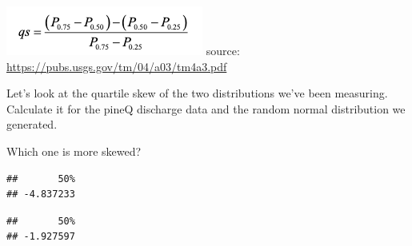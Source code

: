 \documentclass[
]{book}
\newenvironment{Shaded}{\begin{snugshade}}{\end{snugshade}}
\newcommand{\DecValTok}[1]{\textcolor[rgb]{0.00,0.00,0.81}{#1}}
\newcommand{\FunctionTok}[1]{\textcolor[rgb]{0.00,0.00,0.00}{#1}}
\newcommand{\NormalTok}[1]{#1}
\newcommand{\OtherTok}[1]{\textcolor[rgb]{0.56,0.35,0.01}{#1}}
\newcommand{\SpecialCharTok}[1]{\textcolor[rgb]{0.00,0.00,0.00}{#1}}
\begin{document}
\includegraphics{images/Screen Shot 2021-01-25 at 11.27.14 AM.png} source: \url{https://pubs.usgs.gov/tm/04/a03/tm4a3.pdf}

Let's look at the quartile skew of the two distributions we've been measuring. Calculate it for the pineQ discharge data and the random normal distribution we generated.

Which one is more skewed?

\begin{Shaded}
\end{Shaded}

\begin{verbatim}
##       50% 
## -4.837233
\end{verbatim}

\begin{Shaded}
\end{Shaded}

\begin{verbatim}
##       50% 
## -1.927597
\end{verbatim}
\end{document}
